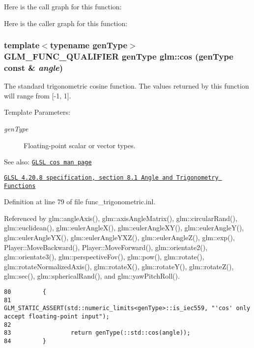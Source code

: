 Here is the call graph for this function:

Here is the caller graph for this function:\hypertarget{group__core__func__trigonometric_gfef15df90786cd24fe786cc0ff2cbc98}{
\subsubsection[cos]{\setlength{\rightskip}{0pt plus 5cm}template$<$typename genType$>$ GLM\_\-FUNC\_\-QUALIFIER genType glm::cos (genType const \& {\em angle})}}
\label{group__core__func__trigonometric_gfef15df90786cd24fe786cc0ff2cbc98}


The standard trigonometric cosine function. The values returned by this function will range from \mbox{[}-1, 1\mbox{]}.

\begin{Desc}
\item[Template Parameters:]
\begin{description}
\item[{\em genType}]Floating-point scalar or vector types.\end{description}
\end{Desc}
\begin{Desc}
\item[See also:]\href{http://www.opengl.org/sdk/docs/manglsl/xhtml/cos.xml}{\tt GLSL cos man page} 

\href{http://www.opengl.org/registry/doc/GLSLangSpec.4.20.8.pdf}{\tt GLSL 4.20.8 specification, section 8.1 Angle and Trigonometry Functions} \end{Desc}


Definition at line 79 of file func\_\-trigonometric.inl.

Referenced by glm::angleAxis(), glm::axisAngleMatrix(), glm::circularRand(), glm::euclidean(), glm::eulerAngleX(), glm::eulerAngleXY(), glm::eulerAngleY(), glm::eulerAngleYX(), glm::eulerAngleYXZ(), glm::eulerAngleZ(), glm::exp(), Player::MoveBackward(), Player::MoveForward(), glm::orientate2(), glm::orientate3(), glm::perspectiveFov(), glm::pow(), glm::rotate(), glm::rotateNormalizedAxis(), glm::rotateX(), glm::rotateY(), glm::rotateZ(), glm::sec(), glm::sphericalRand(), and glm::yawPitchRoll().

\begin{Code}\begin{verbatim}80         {
81                 GLM_STATIC_ASSERT(std::numeric_limits<genType>::is_iec559, "'cos' only accept floating-point input");
82 
83                 return genType(::std::cos(angle));
84         }
\end{verbatim}
\end{Code}




